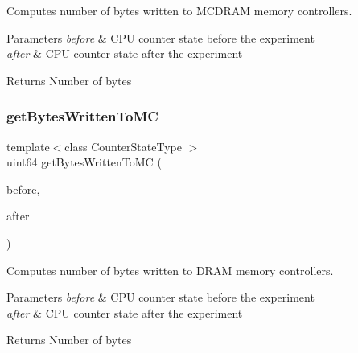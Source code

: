 Computes number of bytes written to M\+C\+D\+R\+AM memory controllers. 


\begin{DoxyParams}{Parameters}
{\em before} & C\+PU counter state before the experiment \\
\hline
{\em after} & C\+PU counter state after the experiment \\
\hline
\end{DoxyParams}
\begin{DoxyReturn}{Returns}
Number of bytes 
\end{DoxyReturn}
\mbox{\label{class_uncore_counter_state_a24fce7df2ee7140db18ecfcd74fe63d1}} 
\subsubsection{\texorpdfstring{get\+Bytes\+Written\+To\+MC}{getBytesWrittenToMC}}
{\footnotesize\ttfamily template$<$class Counter\+State\+Type $>$ \\
uint64 get\+Bytes\+Written\+To\+MC (\begin{DoxyParamCaption}\item[{const Counter\+State\+Type \&}]{before,  }\item[{const Counter\+State\+Type \&}]{after }\end{DoxyParamCaption})\hspace{0.3cm}{\ttfamily [friend]}}



Computes number of bytes written to D\+R\+AM memory controllers. 


\begin{DoxyParams}{Parameters}
{\em before} & C\+PU counter state before the experiment \\
\hline
{\em after} & C\+PU counter state after the experiment \\
\hline
\end{DoxyParams}
\begin{DoxyReturn}{Returns}
Number of bytes 
\end{DoxyReturn}
\mbox{\label{class_uncore_counter_state_a054b949f09283093e1923affa4e58ae8}} 
